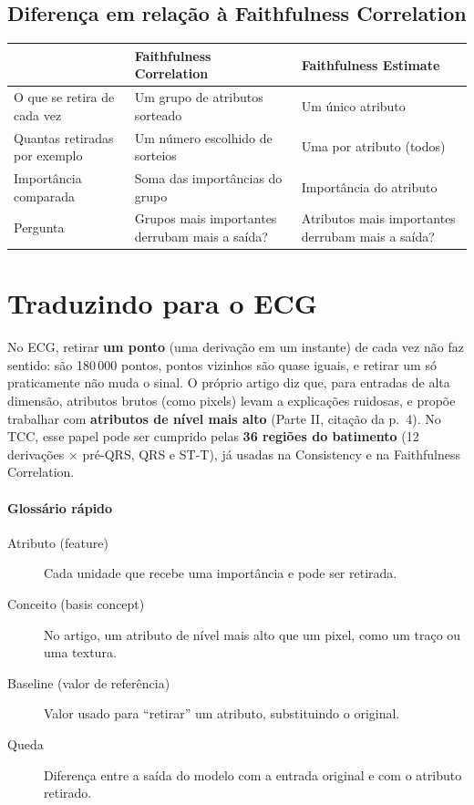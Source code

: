 \documentclass[11pt,a4paper]{article}
\begin{document}
\subsection{Diferença em relação à Faithfulness Correlation}
\begin{center}\small
\begin{tabularx}{\linewidth}{lXX}
\toprule
& \textbf{Faithfulness Correlation} & \textbf{Faithfulness Estimate} \\
\midrule
O que se retira de cada vez & Um grupo de atributos sorteado & Um único atributo \\
Quantas retiradas por exemplo & Um número escolhido de sorteios & Uma por atributo (todos) \\
Importância comparada & Soma das importâncias do grupo & Importância do atributo \\
Pergunta & Grupos mais importantes derrubam mais a saída? & Atributos mais importantes derrubam mais a saída? \\
\bottomrule
\end{tabularx}
\end{center}

\section{Traduzindo para o ECG}
No ECG, retirar \textbf{um ponto} (uma derivação em um instante) de cada vez não faz sentido: são 180\,000 pontos, pontos vizinhos são quase iguais, e retirar um só praticamente não muda o sinal. O próprio artigo diz que, para entradas de alta dimensão, atributos brutos (como pixels) levam a explicações ruidosas, e propõe trabalhar com \textbf{atributos de nível mais alto} (Parte II, citação da p.~4). No TCC, esse papel pode ser cumprido pelas \textbf{36 regiões do batimento} (12 derivações × pré-QRS, QRS e ST-T), já usadas na Consistency e na Faithfulness Correlation.

\paragraph{Glossário rápido}
\begin{description}
\item[Atributo (feature)] Cada unidade que recebe uma importância e pode ser retirada.
\item[Conceito (basis concept)] No artigo, um atributo de nível mais alto que um pixel, como um traço ou uma textura.
\item[Baseline (valor de referência)] Valor usado para “retirar” um atributo, substituindo o original.
\item[Queda] Diferença entre a saída do modelo com a entrada original e com o atributo retirado.
\end{description}
\end{document}
